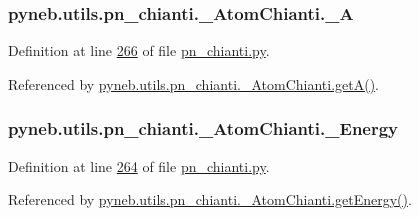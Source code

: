 \subsubsection[{\+\_\+\+A}]{\setlength{\rightskip}{0pt plus 5cm}pyneb.\+utils.\+pn\+\_\+chianti.\+\_\+\+Atom\+Chianti.\+\_\+\+A\hspace{0.3cm}{\ttfamily [private]}}\label{classpyneb_1_1utils_1_1pn__chianti_1_1___atom_chianti_a4d531860236fc5a6564cc861b28cabe7}


Definition at line \hyperlink{pn__chianti_8py_source_l00266}{266} of file \hyperlink{pn__chianti_8py_source}{pn\+\_\+chianti.\+py}.



Referenced by \hyperlink{pn__chianti_8py_source_l00296}{pyneb.\+utils.\+pn\+\_\+chianti.\+\_\+\+Atom\+Chianti.\+get\+A()}.

\hypertarget{classpyneb_1_1utils_1_1pn__chianti_1_1___atom_chianti_a7c9c9c75a6bacb0f6533e870cf556035}{}
\subsubsection[{\+\_\+\+Energy}]{\setlength{\rightskip}{0pt plus 5cm}pyneb.\+utils.\+pn\+\_\+chianti.\+\_\+\+Atom\+Chianti.\+\_\+\+Energy\hspace{0.3cm}{\ttfamily [private]}}\label{classpyneb_1_1utils_1_1pn__chianti_1_1___atom_chianti_a7c9c9c75a6bacb0f6533e870cf556035}


Definition at line \hyperlink{pn__chianti_8py_source_l00264}{264} of file \hyperlink{pn__chianti_8py_source}{pn\+\_\+chianti.\+py}.



Referenced by \hyperlink{pn__chianti_8py_source_l00346}{pyneb.\+utils.\+pn\+\_\+chianti.\+\_\+\+Atom\+Chianti.\+get\+Energy()}.

\hypertarget{classpyneb_1_1utils_1_1pn__chianti_1_1___atom_chianti_a8a718be321d05e4212ff5be195c92b42}{}
